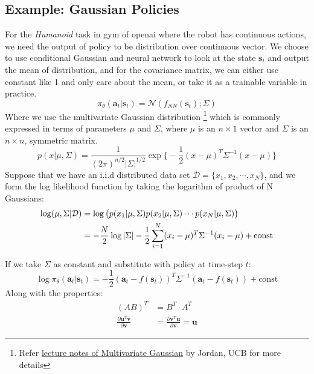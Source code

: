 \documentclass{tufte-handout}
\newcommand{\s}{\mathbf{s}}
\newcommand{\act}{\mathbf{a}}
\begin{document}
\subsection{Example: Gaussian Policies}
For the \emph{Humanoid} task in gym of openai where the robot has continuous actions, we need the output of policy to be distribution over continuous vector. We choose to use conditional Gaussian and neural network to look at the state $\s_t$ and output the mean of distribution, and for the covariance matrix, we can either use constant like 1 and only care about the mean, or take it as a trainable variable in practice.
\begin{equation}
  \label{eq:11}
  \pi_\theta(\act_t | \s_t) = \mathcal{N} (f_{NN} (\s_t); \Sigma)
\end{equation}
Where we use the multivariate Gaussian distribution \thanks{Refer \href{https://people.eecs.berkeley.edu/~jordan/courses/260-spring10/other-readings/chapter13.pdf}{\underline{lecture notes of Multivariate Gaussian}} by Jordan, UCB for more details} which is commonly expressed in terms of parameters $\mu$ and $\Sigma$, where $\mu$ is an $n \times 1$
vector and $\Sigma$ is an $n \times n$, symmetric matrix.
\begin{equation}
  \label{eq:12}
  p(x | \mu, \Sigma) = \frac{1}{ (2\pi)^{n/2} |\Sigma| ^{1/2}} \exp \bigg\{ - \frac{1}{2}(x- \mu)^T \Sigma ^{-1} (x- \mu) \bigg\}
\end{equation}
Suppose that we have an i.i.d distributed data set $\mathcal{D} = \{x_1, x_2, \cdots, x_N \}$, and we form the log likelihood function by taking the logarithm of product of N Gaussians:
\begin{align}
\label{eq:12}
\log(\mu, \Sigma | \mathcal{D})
& = \log \big(p(x_1 | \mu, \Sigma)p(x_2 | \mu, \Sigma) \cdots p(x_N | \mu, \Sigma) \big) \notag \\
& = - \frac{N}{2} \log | \Sigma | - \frac{1}{2} \sum_{i=1} ^N (x_i - \mu)^T \Sigma ^{-1} (x_i - \mu) + \text{const}
\end{align}

\indent If we take $\Sigma$ as constant and  substitute with policy at time-step $t$:
\begin{equation}
\label{eq:13}
\log \pi_\theta (\act_t | \s_t) = -\frac{1}{2} (\act_t - f(\s_t))^T \Sigma ^{-1} (\act_t - f(\s_t)) + \text{const}
\end{equation}
\indent Along with the properties:
\begin{align}
(AB)^T &= B^T \cdot A^T \\
\frac{\partial \mathbf{u}^T \mathbf{v}}{\partial \mathbf{v}} &=\frac{\partial \mathbf{v}^T \mathbf{u}}{\partial \mathbf{v}} = \mathbf{u}
\end{align}
\end{document}
